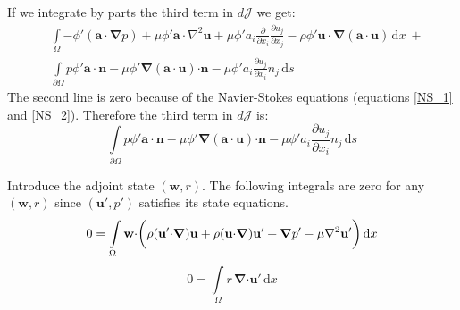 \documentclass[12pt, a4paper]{article}
\begin{document}
If we integrate by parts the third term in $d \mathcal{J}$ we get:
\begin{equation}
\begin{split}
&\int\limits_{\Omega}{- \phi' (\mathbf{a \cdot} \boldsymbol{\nabla} p)} + 
{\mu \phi' \mathbf{a \cdot} \nabla^2 \mathbf{u}} + 
{\mu \phi' a_i \frac{\partial}{\partial x_i} \frac{\partial u_j}{\partial x_j}} - 
{\rho \phi' \mathbf{u \cdot} \boldsymbol{\nabla}(\mathbf{a \cdot u})}
\, \mathrm{d}x \ + \\
&\int\limits_{\partial \Omega}{p \phi' \mathbf{a \cdot n}} - 
{\mu \phi' \boldsymbol{\nabla}(\mathbf{a \cdot u}) \mathbf{\cdot n}} - 
{\mu \phi' a_i \frac{\partial u_j}{\partial x_i} n_j}
\, \mathrm{d}s
\end{split}
\end{equation}
The second line is zero because of the Navier-Stokes equations (equations \ref{NS_1} and \ref{NS_2}). Therefore the third term in $d \mathcal{J}$ is:
\begin{equation} \label{cost_change_term_3}
\int\limits_{\partial \Omega}{p \phi' \mathbf{a \cdot n}} - 
{\mu \phi' \boldsymbol{\nabla}(\mathbf{a \cdot u}) \mathbf{\cdot n}} - 
{\mu \phi' a_i \frac{\partial u_j}{\partial x_i} n_j}
\, \mathrm{d}s
\end{equation}

Introduce the adjoint state $(\mathbf{w}, r)$. The following integrals are zero for any $(\mathbf{w}, r)$ since $(\mathbf{u'}, p')$ satisfies its state equations.
\begin{equation} \label{adj_velocity_original}
0 = \int\limits_{\Omega}\mathbf{w \cdot} \bigg{(}
{\rho (\mathbf{u' \cdot} \boldsymbol{\nabla}) \mathbf{u}} + 
{\rho (\mathbf{u \cdot} \boldsymbol{\nabla}) \mathbf{u'}} + 
{\boldsymbol{\nabla} p'} - 
{\mu \nabla^2 \mathbf{u'}}
\bigg{)} \, \mathrm{d}x
\end{equation}
\begin{equation} \label{adj_pressure_original}
0 = \int\limits_{\Omega}{r \, \boldsymbol{\nabla} \mathbf{\cdot u'}} \, \mathrm{d}x
\end{equation}
\end{document}

